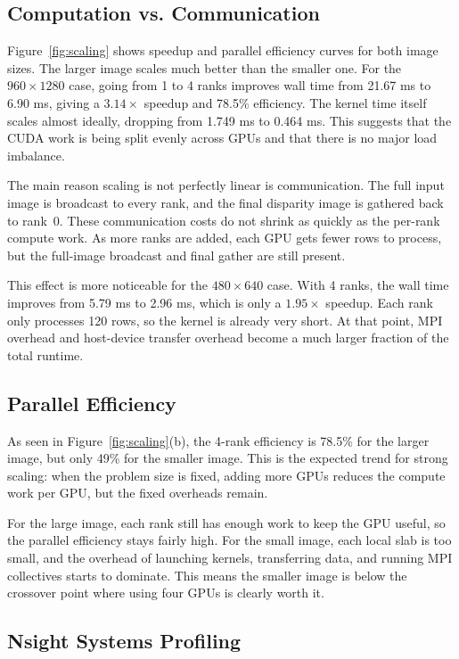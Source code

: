 \documentclass[11pt]{article}
\begin{document}
\subsection{Computation vs. Communication}

Figure~\ref{fig:scaling} shows speedup and parallel efficiency curves for both image
sizes. The larger image scales much better than the smaller one. For the $960\times1280$
case, going from 1 to 4 ranks improves wall time from 21.67 ms to 6.90 ms, giving a
$3.14\times$ speedup and 78.5\% efficiency. The kernel time itself scales almost
ideally, dropping from 1.749 ms to 0.464 ms. This suggests that the CUDA work is
being split evenly across GPUs and that there is no major load imbalance.

The main reason scaling is not perfectly linear is communication. The full input
image is broadcast to every rank, and the final disparity image is gathered back to
rank~0. These communication costs do not shrink as quickly as the per-rank compute
work. As more ranks are added, each GPU gets fewer rows to process, but the full-image
broadcast and final gather are still present.

This effect is more noticeable for the $480\times640$ case. With 4 ranks, the wall
time improves from 5.79 ms to 2.96 ms, which is only a $1.95\times$ speedup. Each
rank only processes 120 rows, so the kernel is already very short. At that point,
MPI overhead and host-device transfer overhead become a much larger fraction of the
total runtime.

\subsection{Parallel Efficiency}

As seen in Figure~\ref{fig:scaling}(b), the 4-rank efficiency is 78.5\% for the larger image, but only 49\% for the smaller
image. This is the expected trend for strong scaling: when the problem size is fixed,
adding more GPUs reduces the compute work per GPU, but the fixed overheads remain.

For the large image, each rank still has enough work to keep the GPU useful, so the
parallel efficiency stays fairly high. For the small image, each local slab is too
small, and the overhead of launching kernels, transferring data, and running MPI
collectives starts to dominate. This means the smaller image is below the crossover
point where using four GPUs is clearly worth it.

\subsection{Nsight Systems Profiling}
\end{document}
